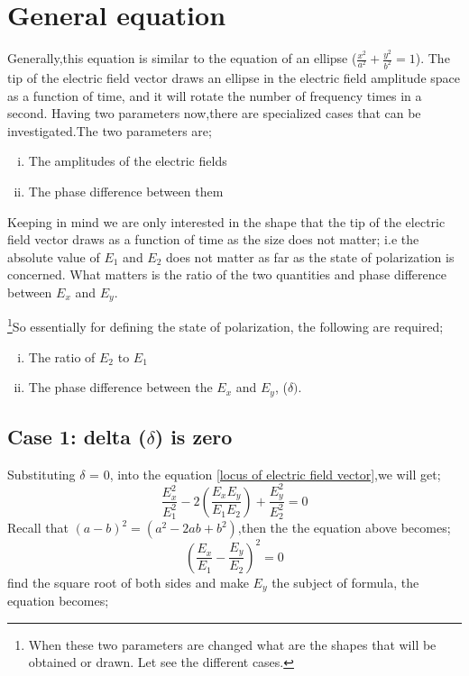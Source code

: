 \section{General equation }
Generally,this equation is similar to the equation of an ellipse ($\frac{x^2}{a^2} + \frac{y^2}{b^2} = 1 $). The tip of the electric field vector draws an ellipse in the electric field amplitude space as a function of time, and it will rotate the number of frequency times in a second. Having two parameters now,there are specialized cases that can be investigated.The two parameters are;
\begin{enumerate}[(i)]
\item The amplitudes of the electric fields
\item The phase difference between them
\end{enumerate}
Keeping in mind we are only interested in the shape that the tip of the electric field vector draws as a function of time as the size does not matter; i.e the absolute value of $ E_1 $ and $ E_2 $ does not matter as far as the state of polarization is concerned. What matters is the ratio of the two quantities and phase difference between $ E_x $ and $ E_y $.

\footnote{When these two parameters are changed what are the shapes that will be obtained or drawn. Let see the different cases.}So essentially for defining the state of polarization, the following  are required;
\begin{enumerate}[(i)] 
\item The ratio of $ E_2 $ to $ E_1 $
\item The phase difference between the $ E_x $ and $ E_y $, ($\delta)$.
\end{enumerate}

\subsection{Case 1: delta ($\delta $) is zero}
Substituting $\delta$ = 0, into the equation \ref{locus of electric field vector},we will get;
\begin{equation}
\frac{E_{x}^2}{E_{1}^2} -2(\frac{E_{x}E_{y}}{E_{1}E_{2}}) + \frac{E_{y}^2}{E_{2}^2} = 0
\end{equation}
Recall that ${(a - b)}^2 = (a^2 -2ab +b^2)$,then the the equation above becomes;
\begin{equation}
{(\frac{E_x}{E_1} - \frac{E_y}{E_2})}^2 = 0
\end{equation}
find the square root of both sides and make $ E_y $ the subject of formula, the equation becomes;

